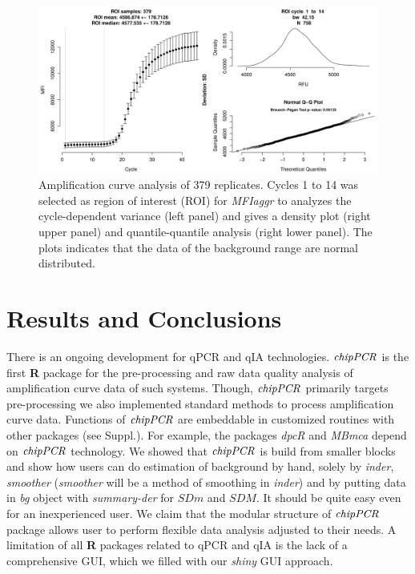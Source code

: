 \documentclass{bioinfo}
\begin{document}
\begin{figure}[!tpb]%
\centerline{\includegraphics{fig01.jpg}}
\caption{Amplification curve analysis of 379 replicates. Cycles 1 to 14 was 
selected as region of interest (ROI) for \textsl{MFIaggr} to analyzes the 
cycle-dependent variance (left panel) and gives a density plot (right upper 
panel) and quantile-quantile analysis (right lower panel). The plots indicates 
that the data of the background range are normal distributed.}\label{fig:01}
\end{figure}

\section{Results and Conclusions}

There is an ongoing development for qPCR and qIA technologies. $\emph{chipPCR}$ 
is the first \textbf{R} package for the pre-processing and raw data quality 
analysis of amplification curve data of such systems. Though, $\emph{chipPCR}$ 
primarily targets pre-processing we also implemented standard methods to process 
amplification curve data. Functions of $\emph{chipPCR}$ are embeddable in 
customized routines with other packages (see Suppl.). For example, the 
packages \emph{dpcR} and \emph{MBmca} depend on $\emph{chipPCR}$ technology. We 
showed that $\emph{chipPCR}$ is build from smaller blocks and show how users can 
do estimation of background by hand, solely by \textsl{inder}, \textsl{smoother} 
(\textsl{smoother} will be a method of smoothing in \textsl{inder}) and by 
putting data in \textsl{bg} object with \textsl{summary-der} for $SDm$ and 
$SDM$. It should be quite easy even for an inexperienced user. We claim that the 
modular structure of $\emph{chipPCR}$ package allows user to perform flexible 
data analysis adjusted to their needs. A limitation of all \textbf{R} packages 
related to qPCR and qIA is the lack of a comprehensive GUI, which we filled with
our \emph{shiny} GUI approach.
\end{document}
